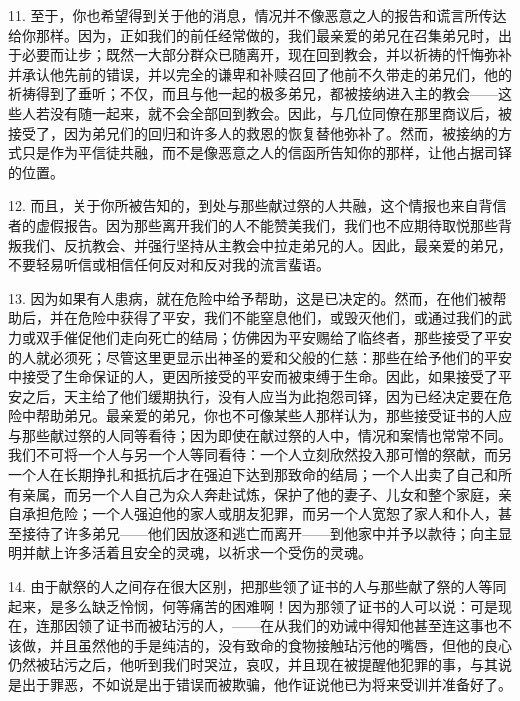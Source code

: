 11. 至于，你也希望得到关于他的消息，情况并不像恶意之人的报告和谎言所传达给你那样。因为，正如我们的前任经常做的，我们最亲爱的弟兄在召集弟兄时，出于必要而让步；既然一大部分群众已随离开，现在回到教会，并以祈祷的忏悔弥补并承认他先前的错误，并以完全的谦卑和补赎召回了他前不久带走的弟兄们，他的祈祷得到了垂听；不仅，而且与他一起的极多弟兄，都被接纳进入主的教会——这些人若没有随一起来，就不会全部回到教会。因此，与几位同僚在那里商议后，被接受了，因为弟兄们的回归和许多人的救恩的恢复替他弥补了。然而，被接纳的方式只是作为平信徒共融，而不是像恶意之人的信函所告知你的那样，让他占据司铎的位置。\par

12. 而且，关于你所被告知的，到处与那些献过祭的人共融，这个情报也来自背信者的虚假报告。因为那些离开我们的人不能赞美我们，我们也不应期待取悦那些背叛我们、反抗教会、并强行坚持从主教会中拉走弟兄的人。因此，最亲爱的弟兄，不要轻易听信或相信任何反对和反对我的流言蜚语。\par

13. 因为如果有人患病，就在危险中给予帮助，这是已决定的。然而，在他们被帮助后，并在危险中获得了平安，我们不能窒息他们，或毁灭他们，或通过我们的武力或双手催促他们走向死亡的结局；仿佛因为平安赐给了临终者，那些接受了平安的人就必须死；尽管这里更显示出神圣的爱和父般的仁慈：那些在给予他们的平安中接受了生命保证的人，更因所接受的平安而被束缚于生命。因此，如果接受了平安之后，天主给了他们缓期执行，没有人应当为此抱怨司铎，因为已经决定要在危险中帮助弟兄。最亲爱的弟兄，你也不可像某些人那样认为，那些接受证书的人应与那些献过祭的人同等看待；因为即使在献过祭的人中，情况和案情也常常不同。我们不可将一个人与另一个人等同看待：一个人立刻欣然投入那可憎的祭献，而另一个人在长期挣扎和抵抗后才在强迫下达到那致命的结局；一个人出卖了自己和所有亲属，而另一个人自己为众人奔赴试炼，保护了他的妻子、儿女和整个家庭，亲自承担危险；一个人强迫他的家人或朋友犯罪，而另一个人宽恕了家人和仆人，甚至接待了许多弟兄——他们因放逐和逃亡而离开——到他家中并予以款待；向主显明并献上许多活着且安全的灵魂，以祈求一个受伤的灵魂。\par

14. 由于献祭的人之间存在很大区别，把那些领了证书的人与那些献了祭的人等同起来，是多么缺乏怜悯，何等痛苦的困难啊！因为那领了证书的人可以说：可是现在，连那因领了证书而被玷污的人，——在从我们的劝诫中得知他甚至连这事也不该做，并且虽然他的手是纯洁的，没有致命的食物接触玷污他的嘴唇，但他的良心仍然被玷污之后，他听到我们时哭泣，哀叹，并且现在被提醒他犯罪的事，与其说是出于罪恶，不如说是出于错误而被欺骗，他作证说他已为将来受训并准备好了。\par


